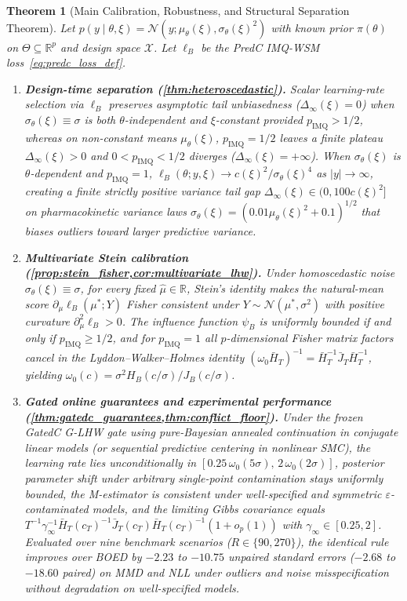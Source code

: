 \documentclass[11pt,a4paper,reqno]{amsart}
\newtheorem{theorem}{Theorem}[section]
\theoremstyle{definition}
\theoremstyle{remark}
\newcommand{\R}{\mathbb{R}}
\newcommand{\Ncal}{\mathcal{N}}
\newcommand{\Xcal}{\mathcal{X}}
\begin{document}
\begin{theorem}[Main Calibration, Robustness, and Structural Separation Theorem]\label{thm:main}
Let $p(y \mid \theta, \xi) = \Ncal(y; \mu_\theta(\xi), \sigma_\theta(\xi)^2)$ with known prior $\pi(\theta)$ on $\Theta \subseteq \R^p$ and design space $\Xcal$. Let $\ell_B$ be the PredC IMQ-WSM loss~\eqref{eq:predc_loss_def}.
\begin{enumerate}[label=(\alph*)]
\item \textbf{Design-time separation (\cref{thm:heteroscedastic}).} Scalar learning-rate selection via $\ell_B$ preserves asymptotic tail unbiasedness ($\Delta_\infty(\xi) = 0$) when $\sigma_\theta(\xi) \equiv \sigma$ is both $\theta$-independent and $\xi$-constant provided $p_{\mathrm{IMQ}} > 1/2$, whereas on non-constant means $\mu_\theta(\xi)$, $p_{\mathrm{IMQ}} = 1/2$ leaves a finite plateau $\Delta_\infty(\xi) > 0$ and $0 < p_{\mathrm{IMQ}} < 1/2$ diverges ($\Delta_\infty(\xi) = +\infty$). When $\sigma_\theta(\xi)$ is $\theta$-dependent and $p_{\mathrm{IMQ}} = 1$, $\ell_B(\theta; y, \xi) \to c(\xi)^2 / \sigma_\theta(\xi)^4$ as $|y|\to\infty$, creating a finite strictly positive variance tail gap $\Delta_\infty(\xi) \in (0, 100 c(\xi)^2]$ on pharmacokinetic variance laws $\sigma_\theta(\xi) = (0.01\mu_\theta(\xi)^2 + 0.1)^{1/2}$ that biases outliers toward larger predictive variance.
\item \textbf{Multivariate Stein calibration (\cref{prop:stein_fisher,cor:multivariate_lhw}).} Under homoscedastic noise $\sigma_\theta(\xi) \equiv \sigma$, for every fixed $\hat{\mu} \in \R$, Stein's identity makes the natural-mean score $\partial_\mu \ell_B(\mu^*; Y)$ Fisher consistent under $Y \sim \Ncal(\mu^*, \sigma^2)$ with positive curvature $\partial_\mu^2 \ell_B > 0$. The influence function $\psi_B$ is uniformly bounded if and only if $p_{\mathrm{IMQ}} \ge 1/2$, and for $p_{\mathrm{IMQ}} = 1$ all $p$-dimensional Fisher matrix factors cancel in the Lyddon--Walker--Holmes identity $(\omega_0\bar{H}_T)^{-1} = \bar{H}_T^{-1}\bar{J}_T\bar{H}_T^{-1}$, yielding $\omega_0(c) = \sigma^2 H_B(c/\sigma) / J_B(c/\sigma)$.
\item \textbf{Gated online guarantees and experimental performance (\cref{thm:gatedc_guarantees,thm:conflict_floor}).} Under the frozen GatedC G-LHW gate using pure-Bayesian annealed continuation in conjugate linear models (or sequential predictive centering in nonlinear SMC), the learning rate lies unconditionally in $[0.25\,\omega_0(5\sigma),\, 2\,\omega_0(2\sigma)]$, posterior parameter shift under arbitrary single-point contamination stays uniformly bounded, the M-estimator is consistent under well-specified and symmetric $\varepsilon$-contaminated models, and the limiting Gibbs covariance equals $T^{-1}\gamma_\infty^{-1}\bar{H}_T(c_T)^{-1}\bar{J}_T(c_T)\bar{H}_T(c_T)^{-1}(1 + o_p(1))$ with $\gamma_\infty \in [0.25, 2]$. Evaluated over nine benchmark scenarios ($R \in \{90, 270\}$), the identical rule improves over BOED by $-2.23$ to $-10.75$ unpaired standard errors ($-2.68$ to $-18.60$ paired) on MMD and NLL under outliers and noise misspecification without degradation on well-specified models.
\end{enumerate}
\end{theorem}
\end{document}
